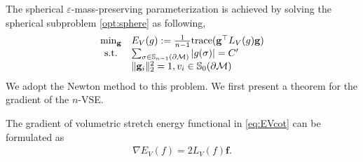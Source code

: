 \documentclass{article}
\begin{document}
The spherical $\varepsilon$-mass-preserving parameterization is achieved by solving the spherical subproblem \eqref{opt:sphere} as following,
\begin{align} %
\begin{array}{l@{}c@{\quad}l}
    & \min_\mathbf{g} & E_V(g):=\frac{1}{n-1} \trace(\mathbf{g}^\top L_V(g) \mathbf{g})\\
    & \text{s.t.} & \sum_{\sigma\in \mathbb{S}_{n-1}(\partial \mathcal{M})} |g(\sigma)| = C'\\
    && \|\mathbf{g}_i\|_2^2 = 1, v_i\in \mathbb{S}_0(\partial \mathcal{M})
\end{array}
\end{align}
We adopt the Newton method to this problem. We first present a theorem for the gradient of the $n$-VSE.
\begin{theorem} \label{thm:gradient}
The gradient of volumetric stretch energy functional in \eqref{eq:EVcot} can be formulated as
\begin{align} \label{eq:GradE}
    \nabla E_V(f) = 2 L_V(f) \mathbf{f}.
\end{align}
\end{theorem}
\end{document}
